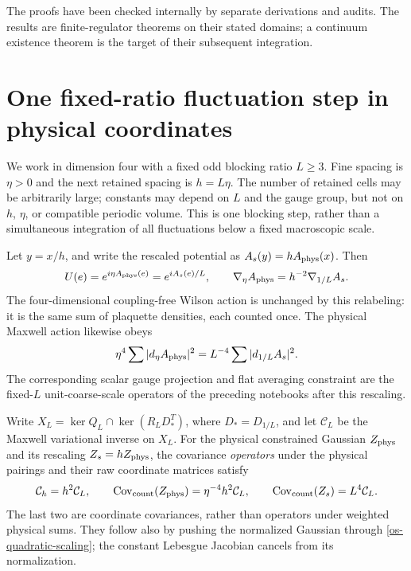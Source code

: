 \documentclass[11pt]{article}
\theoremstyle{remark}
\begin{document}
The proofs have been checked internally by separate derivations and
audits. The results are finite-regulator theorems on their stated
domains; a continuum existence theorem is the target of their
subsequent integration.


\section{One fixed-ratio fluctuation step in physical coordinates}
\label{os-section}

We work in dimension four with a fixed odd blocking ratio
$L\ge3$. Fine spacing is $\eta>0$ and the next retained
spacing is $h=L\eta$. The number of retained cells may be
arbitrarily large; constants may depend on $L$ and the gauge
group, but not on $h$, $\eta$, or compatible periodic volume.
This is one blocking step, rather than a simultaneous
integration of all fluctuations below a fixed macroscopic scale.

Let $y=x/h$, and write the rescaled potential as
$A_s(y)=hA_{\rm phys}(x)$. Then
\begin{equation}\label{os-rescaling}
 U(e)=e^{i\eta A_{\rm phys}(e)}=e^{iA_s(e)/L},\qquad
 \nabla_\eta A_{\rm phys}=h^{-2}\nabla_{1/L}A_s.
\end{equation}
The four-dimensional coupling-free Wilson action is unchanged
by this relabeling: it is the same sum of plaquette densities,
each counted once. The physical Maxwell action likewise obeys
\begin{equation}\label{os-quadratic-scaling}
 \eta^4\sum|d_\eta A_{\rm phys}|^2
       =L^{-4}\sum|d_{1/L}A_s|^2.
\end{equation}
The corresponding scalar gauge projection and flat averaging
constraint are the fixed-$L$ unit-coarse-scale operators of
the preceding notebooks after this rescaling.

Write $X_L=\ker Q_L\cap\ker(R_LD_*^T)$, where
$D_*=D_{1/L}$, and let $\mathcal C_L$ be the Maxwell
variational inverse on $X_L$. For the physical constrained
Gaussian $Z_{\rm phys}$ and its rescaling $Z_s=hZ_{\rm phys}$,
the covariance \emph{operators} under the physical pairings
and their raw coordinate matrices satisfy
\begin{equation}\label{os-covariance-scaling}
 \mathcal C_h=h^2\mathcal C_L,\qquad
 \operatorname{Cov}_{\rm count}(Z_{\rm phys})
       =\eta^{-4}h^2\mathcal C_L,\qquad
 \operatorname{Cov}_{\rm count}(Z_s)=L^4\mathcal C_L.
\end{equation}
The last two are coordinate covariances, rather than operators
under weighted physical sums. They follow also by pushing the
normalized Gaussian through \eqref{os-quadratic-scaling};
the constant Lebesgue Jacobian cancels from its normalization.
\end{document}
